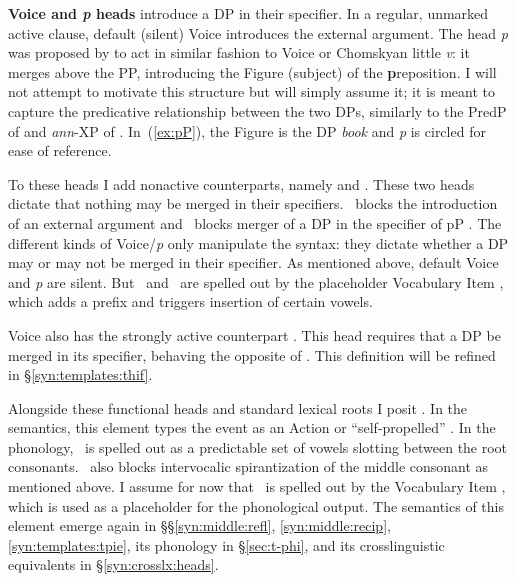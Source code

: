\textbf{Voice and \emph{p} heads} introduce a DP in their specifier. In a regular, unmarked active clause, default (silent) Voice introduces the external argument. The head \emph{p} was proposed by \cite{svenonius03,svenonius07} to act in similar fashion to Voice or Chomskyan little \textit{v}: it merges above the PP, introducing the Figure (subject) of the \textbf{p}reposition. I will not attempt to motivate this structure but will simply assume it; it is meant to capture the predicative relationship between the two DPs, similarly to the PredP of \cite{bowers93,bowers01} and \emph{ann}-XP of \cite{mccloskey14}. In~(\ref{ex:pP}), the Figure is the DP \emph{book} and \emph{p} is circled for ease of reference.
\ex \label{ex:pP}
\xe

To these heads I add nonactive counterparts, namely \textbf{\vz} and \textbf{\pz}. These two heads dictate that nothing may be merged in their specifiers. \vz~blocks the introduction of an external argument \citep{doron03,alexiadoudoron12,bruening13,wood15springer,spathasetal15} and \pz~blocks merger of a DP in the specifier of pP \citep{wood15springer}. The different kinds of Voice/\emph{p} only manipulate the syntax: they dictate whether a DP may or may not be merged in their specifier. As mentioned above, default Voice and \emph{p} are silent. But \vz~and \pz~are spelled out by the placeholder Vocabulary Item , which adds a prefix and triggers insertion of certain vowels.

Voice also has the strongly active counterpart \textbf{\vd}. This head requires that a DP be merged in its specifier, behaving the opposite of \vz. This definition will be refined in \S\ref{syn:templates:thif}.

Alongside these functional heads and standard lexical roots I posit \textbf{\va}. In the semantics, this {element} types the event as an Action \citep{doron03} or ``self-propelled'' \citep{folliharley08}. In the phonology, \va~is spelled out as a predictable set of vowels slotting between the root consonants. \va~also blocks intervocalic spirantization of the middle consonant as mentioned above. I assume {for now} that \va~is spelled out by the Vocabulary Item , which is used as a placeholder for the phonological output. The semantics of this element emerge again in \S\S\ref{syn:middle:refl}, \ref{syn:middle:recip}, \ref{syn:templates:tpie}, its phonology in \S\ref{sec:t-phi}, and its crosslinguistic equivalents in \S\ref{syn:crosslx:heads}.

